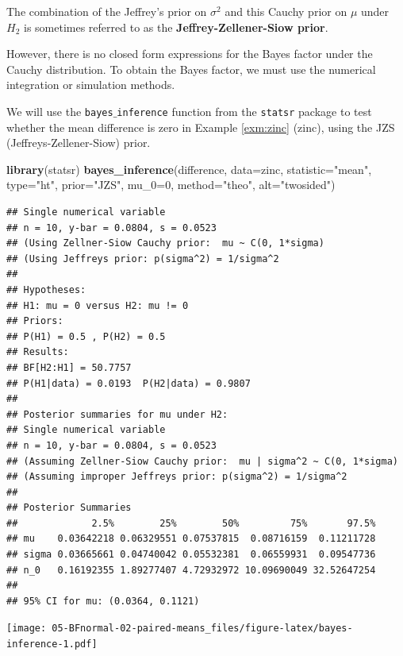 \documentclass[]{book}
\newenvironment{Shaded}{\begin{snugshade}}{\end{snugshade}}
\newcommand{\KeywordTok}[1]{\textcolor[rgb]{0.13,0.29,0.53}{\textbf{{#1}}}}
\newcommand{\DataTypeTok}[1]{\textcolor[rgb]{0.13,0.29,0.53}{{#1}}}
\newcommand{\DecValTok}[1]{\textcolor[rgb]{0.00,0.00,0.81}{{#1}}}
\newcommand{\StringTok}[1]{\textcolor[rgb]{0.31,0.60,0.02}{{#1}}}
\newcommand{\NormalTok}[1]{{#1}}
\theoremstyle{definition}
\theoremstyle{definition}
\theoremstyle{definition}
\theoremstyle{remark}
\begin{document}
The combination of the Jeffrey's prior on \(\sigma^2\) and this Cauchy
prior on \(\mu\) under \(H_2\) is sometimes referred to as the
\textbf{Jeffrey-Zellener-Siow prior}.

However, there is no closed form expressions for the Bayes factor under
the Cauchy distribution. To obtain the Bayes factor, we must use the
numerical integration or simulation methods.

We will use the \texttt{bayes$\_$inference} function from the
\texttt{statsr} package to test whether the mean difference is zero in
Example \ref{exm:zinc} (zinc), using the JZS (Jeffreys-Zellener-Siow)
prior.

\begin{Shaded}
\begin{Highlighting}[]
\KeywordTok{library}\NormalTok{(statsr)}
\KeywordTok{bayes_inference}\NormalTok{(difference, }\DataTypeTok{data=}\NormalTok{zinc, }\DataTypeTok{statistic=}\StringTok{"mean"}\NormalTok{, }\DataTypeTok{type=}\StringTok{"ht"}\NormalTok{,}
                \DataTypeTok{prior=}\StringTok{"JZS"}\NormalTok{, }\DataTypeTok{mu_0=}\DecValTok{0}\NormalTok{, }\DataTypeTok{method=}\StringTok{"theo"}\NormalTok{, }\DataTypeTok{alt=}\StringTok{"twosided"}\NormalTok{)}
\end{Highlighting}
\end{Shaded}

\begin{verbatim}
## Single numerical variable
## n = 10, y-bar = 0.0804, s = 0.0523
## (Using Zellner-Siow Cauchy prior:  mu ~ C(0, 1*sigma)
## (Using Jeffreys prior: p(sigma^2) = 1/sigma^2
## 
## Hypotheses:
## H1: mu = 0 versus H2: mu != 0
## Priors:
## P(H1) = 0.5 , P(H2) = 0.5
## Results:
## BF[H2:H1] = 50.7757
## P(H1|data) = 0.0193  P(H2|data) = 0.9807 
## 
## Posterior summaries for mu under H2:
## Single numerical variable
## n = 10, y-bar = 0.0804, s = 0.0523
## (Assuming Zellner-Siow Cauchy prior:  mu | sigma^2 ~ C(0, 1*sigma)
## (Assuming improper Jeffreys prior: p(sigma^2) = 1/sigma^2
## 
## Posterior Summaries
##             2.5%        25%        50%         75%       97.5%
## mu    0.03642218 0.06329551 0.07537815  0.08716159  0.11211728
## sigma 0.03665661 0.04740042 0.05532381  0.06559931  0.09547736
## n_0   0.16192355 1.89277407 4.72932972 10.09690049 32.52647254
## 
## 95% CI for mu: (0.0364, 0.1121)
\end{verbatim}

\texttt{[image: 05-BFnormal-02-paired-means\_files/figure-latex/bayes-inference-1.pdf]}
\end{document}
